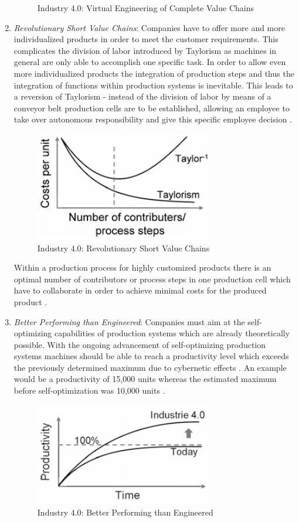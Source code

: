\begin{enumerate}
\begin{figure}[h!]
\centering
\caption{Industry 4.0: Virtual Engineering of Complete Value Chains \cite{IN4HYPO}}
\label{fig:2.3}
\end{figure}
\item \textit{Revolutionary Short Value Chains}: Companies have to offer more and more individualized products in order to meet the customer requirements. This complicates the division of labor introduced by Taylorism as machines in general are only able to accomplish one specific task. In order to allow even more individualized products the integration of production steps and thus the integration of functions within production systems is inevitable. This leads to a reversion of Taylorism - instead of the division of labor by means	of a conveyor belt production cells are to be established, allowing an employee to take over autonomous responsibility and give this specific employee decision \cite{IN4HYPO}. 
\begin{figure}[h!]
\includegraphics[scale=0.5]{./gfx/revvalchain}
\centering
\caption{Industry 4.0: Revolutionary Short Value Chains \cite{IN4HYPO}}
\label{fig:2.4}
\end{figure}

Within a production process for highly customized products there is an optimal number of contributors or process steps in one production cell which have to collaborate in order to achieve minimal costs for the produced product  \cite{IN4HYPO}.
\item \textit{Better Performing than Engineered}: Companies must aim at the self-optimizing	capabilities of production systems which are already theoretically possible. With the ongoing advancement of self-optimizing production systems machines should be able to reach a productivity level which exceeds the previously determined maximum due to cybernetic effects . An example would be a productivity of 15,000 units whereas the estimated maximum before self-optimization was 10,000 units \cite{IN4HYPO}.
\begin{figure}[h!]
\includegraphics[scale=0.5]{./gfx/revengg}
\centering
\caption{Industry 4.0: Better Performing than Engineered \cite{IN4HYPO}}
\label{fig:2.5}
\end{figure}
\end{enumerate}
